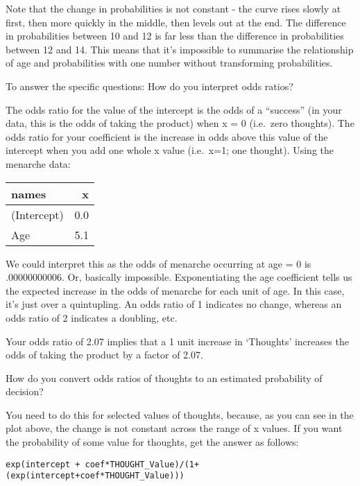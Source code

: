 \documentclass[11pt,dvipsnames,ignorenonframetext,aspectratio=169]{beamer}
\begin{document}
\begin{frame}{}
\protect\hypertarget{section-13}{}

Note that the change in probabilities is not constant - the curve rises
slowly at first, then more quickly in the middle, then levels out at the
end. The difference in probabilities between 10 and 12 is far less than
the difference in probabilities between 12 and 14. This means that it's
impossible to summarise the relationship of age and probabilities with
one number without transforming probabilities.

To answer the specific questions: How do you interpret odds ratios?

The odds ratio for the value of the intercept is the odds of a
``success'' (in your data, this is the odds of taking the product) when
x = 0 (i.e.~zero thoughts). The odds ratio for your coefficient is the
increase in odds above this value of the intercept when you add one
whole x value (i.e.~x=1; one thought). Using the menarche data:

\begin{table}[H]
\centering\begingroup\fontsize{6}{8}\selectfont

\begin{tabular}{lr}
\toprule
names & x\\
\midrule
\rowcolor{gray!6}  (Intercept) & 0.0\\
Age & 5.1\\
\bottomrule
\end{tabular}
\endgroup{}
\end{table}

\end{frame}

\begin{frame}[fragile]{}
\protect\hypertarget{section-14}{}

We could interpret this as the odds of menarche occurring at age = 0 is
.00000000006. Or, basically impossible. Exponentiating the age
coefficient tells us the expected increase in the odds of menarche for
each unit of age. In this case, it's just over a quintupling. An odds
ratio of 1 indicates no change, whereas an odds ratio of 2 indicates a
doubling, etc.

Your odds ratio of 2.07 implies that a 1 unit increase in `Thoughts'
increases the odds of taking the product by a factor of 2.07.

How do you convert odds ratios of thoughts to an estimated probability
of decision?

You need to do this for selected values of thoughts, because, as you can
see in the plot above, the change is not constant across the range of x
values. If you want the probability of some value for thoughts, get the
answer as follows:

\texttt{exp(intercept\ +\ coef*THOUGHT\_Value)/(1+(exp(intercept+coef*THOUGHT\_Value)))}

\end{frame}
\end{document}

